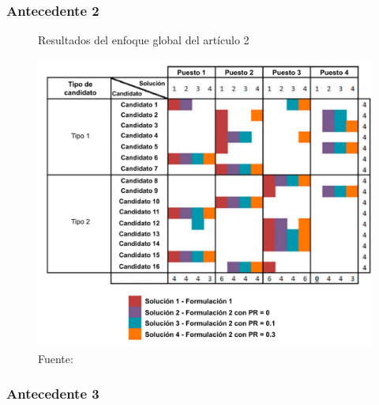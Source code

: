 \subsubsection{Antecedente 2}

\lipsum[2]

\begin{figure}[H]
    \centering
    \caption{Resultados del enfoque global del artículo 2}
    \includegraphics[width=1.0\textwidth]{E_IMAGENES/1_Capitulo2/1-research-background/Paper_2_2.pdf}
    \caption*{Fuente: \citet{PESSACH2020113290}}
    \label{fig:Paper_2_2}
\end{figure}

\subsubsection{Antecedente 3}

\lipsum[3]

